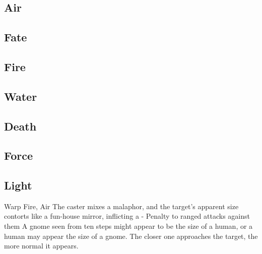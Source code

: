 \begin{multicols}{2}

\subsection{Air}



\subsection{Fate}


\subsection{Fire}


\subsection{Water}


\subsection{Death}


\subsection{Force}


\null
\subsection{Light}

  {}%
  {Warp}%
  {Fire, Air}%
  {}%
  {The caster mixes a malaphor, and the target's apparent size contorts like a fun-house mirror, inflicting a - Penalty to ranged attacks against them}%
  {A gnome seen from ten steps might appear to be the size of a human, or a human may appear the size of a gnome.
    The closer one approaches the target, the more normal it appears.}


\end{multicols}
